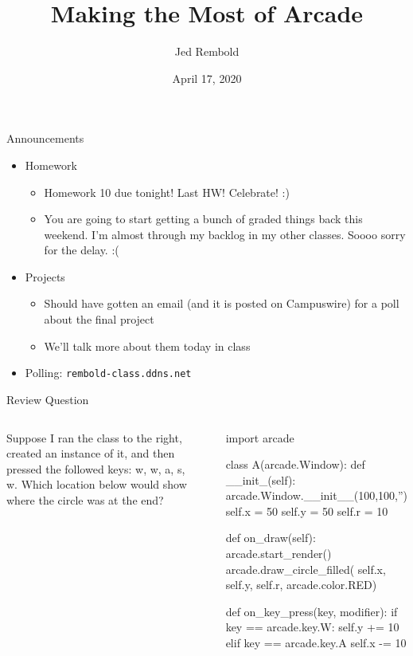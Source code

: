 \documentclass[pdf, aspectratio=169, 12pt]{beamer}
\title{Making the Most of Arcade}
\author{Jed Rembold}
\date{April 17, 2020}
\begin{document}
\begin{frame}{Announcements}
	\begin{itemize}
		\item Homework
			\begin{itemize}
				\item Homework 10 due tonight! Last HW! Celebrate! :)
				\item You are going to start getting a bunch of graded things back this weekend. I'm almost through my backlog in my other classes. \alert{Soooo} sorry for the delay. :(
			\end{itemize}
		\item Projects
			\begin{itemize}
				\item Should have gotten an email (and it is posted on Campuswire) for a poll about the final project
				\item We'll talk more about them today in class
			\end{itemize}
		\item Polling: \nolinkurl{rembold-class.ddns.net}
	\end{itemize}
\end{frame}

\begin{frame}[fragile]{Review Question}
	\begin{columns}

		\vspace{3mm}
		\small
		Suppose I ran the class to the right, created an instance of it, and then pressed the followed keys: w, w,  a, s, w. Which location below would show where the circle was at the end?
		\begin{center}
			
		\end{center}
		\scriptsize
		\begin{pythoncode}
			import arcade

			class A(arcade.Window):
				def __init_(self):
					arcade.Window.__init__(100,100,'')
					self.x = 50
					self.y = 50
					self.r = 10

				def on_draw(self):
					arcade.start_render()
					arcade.draw_circle_filled(
									self.x,
									self.y,
									self.r,
									arcade.color.RED)

				def on_key_press(key, modifier):
					if key == arcade.key.W:
						self.y += 10
					elif key == arcade.key.A
						self.x -= 10
		\end{pythoncode}
	\end{columns}
\end{frame}
\end{document}
